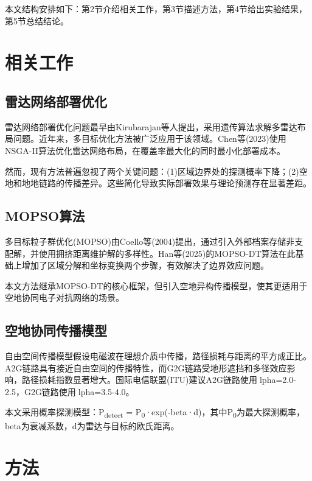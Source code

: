 本文结构安排如下：第2节介绍相关工作，第3节描述方法，第4节给出实验结果，第5节总结结论。



\section{相关工作}
\label{sec:related}

\subsection{雷达网络部署优化}

雷达网络部署优化问题最早由Kirubarajan等人提出，采用遗传算法求解多雷达布局问题。近年来，多目标优化方法被广泛应用于该领域。Chen等(2023)使用NSGA-II算法优化雷达网络布局，在覆盖率最大化的同时最小化部署成本。

然而，现有方法普遍忽视了两个关键问题：(1)区域边界处的探测概率下降；(2)空地和地地链路的传播差异。这些简化导致实际部署效果与理论预测存在显著差距。

\subsection{MOPSO算法}

多目标粒子群优化(MOPSO)由Coello等(2004)提出，通过引入外部档案存储非支配解，并使用拥挤距离维护解的多样性。Han等(2025)的MOPSO-DT算法在此基础上增加了区域分解和坐标变换两个步骤，有效解决了边界效应问题。

本文方法继承MOPSO-DT的核心框架，但引入空地异构传播模型，使其更适用于空地协同电子对抗网络的场景。

\subsection{空地协同传播模型}

自由空间传播模型假设电磁波在理想介质中传播，路径损耗与距离的平方成正比。A2G链路具有接近自由空间的传播特性，而G2G链路受地形遮挡和多径效应影响，路径损耗指数显著增大。国际电信联盟(ITU)建议A2G链路使用lpha=2.0-2.5，G2G链路使用lpha=3.5-4.0。

本文采用概率探测模型：P\textsubscript{detect} = P\textsubscript{0}·exp(-beta·d)，其中P\textsubscript{0}为最大探测概率，beta为衰减系数，d为雷达与目标的欧氏距离。

\section{方法}
\label{sec:method}

